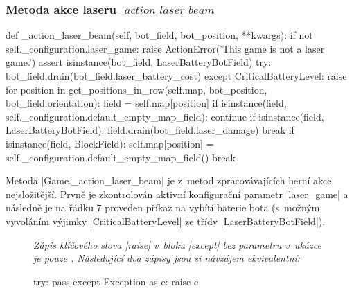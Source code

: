 {\subsubsection{Metoda akce laseru $\_action\_laser\_beam$}
\label{subsubsec:method-action-laser-beam}

\begin{code}[caption={Metoda $Game.\_action\_laser\_beam$},label={lst:game-action-laser-beam}]
def _action_laser_beam(self, bot_field, bot_position, **kwargs):
    if not self._configuration.laser_game:
        raise ActionError('This game is not a laser game.')
    assert isinstance(bot_field, LaserBatteryBotField)
    try:
        bot_field.drain(bot_field.laser_battery_cost)
    except CriticalBatteryLevel:
        raise
    for position in get_positions_in_row(self.map, bot_position, bot_field.orientation):
        field = self.map[position]
        if isinstance(field, self._configuration.default_empty_map_field):
            continue
        if isinstance(field, LaserBatteryBotField):
            field.drain(bot_field.laser_damage)
            break
        if isinstance(field, BlockField):
            self.map[position] = self._configuration.default_empty_map_field()
            break
\end{code}

\begin{sloppypar}
    Metoda \ic|Game._action_laser_beam| je z~metod zpracovávajících herní akce nejsložitější. Prvně je zkontrolován aktivní konfigurační parametr \ic|laser_game| a následně je na řádku $7$ proveden příkaz na vybítí baterie bota (s~možným vyvoláním výjimky \ic|CriticalBatteryLevel| ze třídy \ic|LaserBatteryBotField|).
\end{sloppypar}

\begin{figure}[!h]
    {\itshape
    Zápis klíčového slova \ic|raise| v~bloku \ic|except| bez parametru v~ukázce  je pouze \footnotemark. Následující dva zápisy jsou si návzájem ekvivalentní:}

    \begin{minipage}[b][50\lineheight]{.47\textwidth}
    \begin{code}
try:
    pass
except Exception as e:
    raise e
    \end{code}
    \end{minipage}
    \hfill
    \begin{minipage}[b][50\lineheight]{.47\textwidth}
    

\end{minipage}
\end{figure}}
